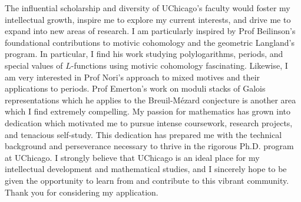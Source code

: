 \documentclass[11pt]{article}
\begin{document}
\par
The influential scholarship and diversity of UChicago's faculty would foster my intellectual growth, inspire me to explore my current interests, and drive me to expand into new areas of research. I am particularly inspired by Prof Beilinson's foundational contributions to motivic cohomology and the geometric Langland's program. In particular, I find his work studying polylogarithms, periods, and special values of $L$-functions using motivic cohomology fascinating. Likewise, I am very interested in Prof Nori's approach to mixed motives and their applications to periods. Prof Emerton's work on moduli stacks of Galois representations which he applies to the Breuil-M\'{e}zard conjecture is another area which I find extremely compelling. My passion for mathematics has grown into dedication which motivated me to pursue intense coursework, research projects, and tenacious self-study. This dedication has prepared me with the technical background and perseverance necessary to thrive in the rigorous Ph.D. program at UChicago. I strongly believe that UChicago is an ideal place for my intellectual development and mathematical studies, and I sincerely hope to be given the opportunity to learn from and contribute to this vibrant community. Thank you for considering my application.
\end{document}
